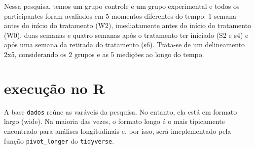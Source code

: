 \documentclass[
]{book}
\begin{document}
Nessa pesquisa, temos um grupo controle e um grupo experimental e todos os participantes foram avaliados em 5 momentos diferentes do tempo: 1 semana antes do início do tratamento (W2), imediatamente antes do início do tratamento (W0), duas semanas e quatro semanas após o tratamento ter iniciado (S2 e s4) e após uma semana da retirada do tratamento (s6). Trata-se de um delineamento 2x5, considerando os 2 grupos e as 5 medições ao longo do tempo.

\hypertarget{execuuxe7uxe3o-no-r-12}{%
\section{execução no R}\label{execuuxe7uxe3o-no-r-12}}

A base \texttt{dados} reúne as varáveis da pesquisa. No entanto, ela está em formato largo (wide). Na maioria das vezes, o formato longo é o mais tipicamente encontrado para análises longitudinais e, por isso, será imeplementado pela função \texttt{pivot\_longer} do \texttt{tidyverse}.
\end{document}
